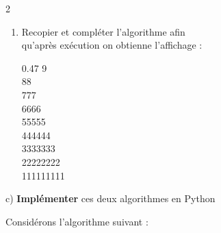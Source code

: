\begin{boxexstheorieligne}
\begin{multicols}{2}
\begin{enumerate}[label=\alph*),left=0mm]
\vspace*{0mm}
\begin{center}\begin{affichage}{0.47}
1\\
22\\
333\\
4444\\
55555\\
666666\\
7777777\\
88888888\\
999999999
\end{affichage}\end{center}
\item Recopier et compléter l'algorithme afin\\ qu'après exécution on obtienne l'affichage :

\vspace*{0mm}
\begin{center}\begin{affichage}{0.47}
9\\
88\\
777\\
6666\\
55555\\
444444\\
3333333\\
22222222\\
111111111
\end{affichage}\end{center}
\end{enumerate}
\end{multicols}

\vspace{0mm}
\hspace{4mm}c) {\bf Implémenter} ces deux algorithmes en Python



\eexo


\exo
Considérons l'algorithme suivant :


\end{boxexstheorieligne}
